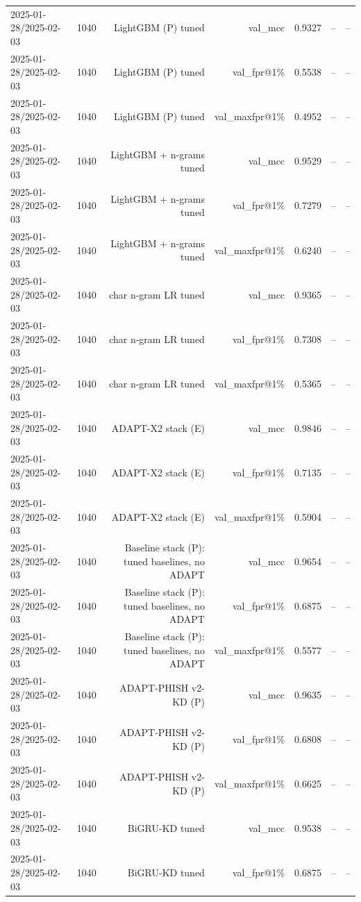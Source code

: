 \begin{table}[t]
\begin{tabular}{llrrrrr}
2025-01-28/2025-02-03 & 1040 & LightGBM (P) tuned & val\_mcc & 0.9327 & -- & -- \\
2025-01-28/2025-02-03 & 1040 & LightGBM (P) tuned & val\_fpr@1\% & 0.5538 & -- & -- \\
2025-01-28/2025-02-03 & 1040 & LightGBM (P) tuned & val\_maxfpr@1\% & 0.4952 & -- & -- \\
2025-01-28/2025-02-03 & 1040 & LightGBM + n-grams tuned & val\_mcc & 0.9529 & -- & -- \\
2025-01-28/2025-02-03 & 1040 & LightGBM + n-grams tuned & val\_fpr@1\% & 0.7279 & -- & -- \\
2025-01-28/2025-02-03 & 1040 & LightGBM + n-grams tuned & val\_maxfpr@1\% & 0.6240 & -- & -- \\
2025-01-28/2025-02-03 & 1040 & char n-gram LR tuned & val\_mcc & 0.9365 & -- & -- \\
2025-01-28/2025-02-03 & 1040 & char n-gram LR tuned & val\_fpr@1\% & 0.7308 & -- & -- \\
2025-01-28/2025-02-03 & 1040 & char n-gram LR tuned & val\_maxfpr@1\% & 0.5365 & -- & -- \\
2025-01-28/2025-02-03 & 1040 & ADAPT-X2 stack (E) & val\_mcc & 0.9846 & -- & -- \\
2025-01-28/2025-02-03 & 1040 & ADAPT-X2 stack (E) & val\_fpr@1\% & 0.7135 & -- & -- \\
2025-01-28/2025-02-03 & 1040 & ADAPT-X2 stack (E) & val\_maxfpr@1\% & 0.5904 & -- & -- \\
2025-01-28/2025-02-03 & 1040 & Baseline stack (P): tuned baselines, no ADAPT & val\_mcc & 0.9654 & -- & -- \\
2025-01-28/2025-02-03 & 1040 & Baseline stack (P): tuned baselines, no ADAPT & val\_fpr@1\% & 0.6875 & -- & -- \\
2025-01-28/2025-02-03 & 1040 & Baseline stack (P): tuned baselines, no ADAPT & val\_maxfpr@1\% & 0.5577 & -- & -- \\
2025-01-28/2025-02-03 & 1040 & ADAPT-PHISH v2-KD (P) & val\_mcc & 0.9635 & -- & -- \\
2025-01-28/2025-02-03 & 1040 & ADAPT-PHISH v2-KD (P) & val\_fpr@1\% & 0.6808 & -- & -- \\
2025-01-28/2025-02-03 & 1040 & ADAPT-PHISH v2-KD (P) & val\_maxfpr@1\% & 0.6625 & -- & -- \\
2025-01-28/2025-02-03 & 1040 & BiGRU-KD tuned & val\_mcc & 0.9538 & -- & -- \\
2025-01-28/2025-02-03 & 1040 & BiGRU-KD tuned & val\_fpr@1\% & 0.6875 & -- & -- \\

\end{tabular}
\end{table}
